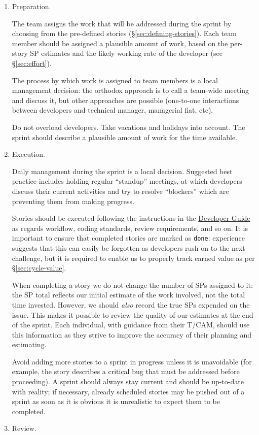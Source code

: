 \begin{enumerate}
\item
  Preparation.

  The team assigns the work that will be addressed during the sprint by choosing from the pre-defined stories (\S\ref{sec:defining-stories}).
  Each team member should be assigned a plausible amount of work, based on the per-\gls{story} \gls{SP} estimates and the likely working rate of the developer (see \S\ref{sec:effort}).

  The process by which work is assigned to team members is a local
  management decision: the orthodox approach is to call a team-wide
  meeting and discuss it, but other approaches are possible (one-to-one
  interactions between developers and technical manager, managerial
  fiat, etc).

  Do not overload developers. Take vacations and holidays into account.
  The sprint should describe a plausible amount of work for the time
  available.
\item
  Execution.

  Daily management during the sprint is a local decision. Suggested best
  practice includes holding regular ``standup'' meetings, at which
  developers discuss their current activities and try to resolve
  ``blockers'' which are preventing them from making progress.

  Stories should be executed following the instructions in the
  \href{http://developer.lsst.io/}{Developer Guide} as regards workflow,
  coding standards, review requirements, and so on. It is important to
  ensure that completed stories are marked as \texttt{done}:
  experience suggests that this can easily be forgotten as developers
  rush on to the next challenge, but it is required to enable us to
  properly track earned value as per \S\ref{sec:cycle-value}.

  When completing a \gls{story} we do not change the number of \glspl{SP} assigned to
  it: the \gls{SP} total reflects our initial estimate of the work involved,
  not the total time invested.
  However, we should \textit{also} record the true \glspl{SP} expended on the issue.
  This makes it possible to review the quality of our estimates at the end of the sprint.
  Each individual, with guidance from their \gls{T/CAM}, should use this information as they strive to improve the accuracy of their planning and estimating.

  Avoid adding more stories to a sprint in progress unless it is
  unavoidable (for example, the \gls{story} describes a critical bug that must
  be addressed before proceeding). A sprint should always stay current
  and should be up-to-date with reality; if necessary, already scheduled
  stories may be pushed out of a sprint as soon as it is obvious it is
  unrealistic to expect them to be completed.
\item
  \gls{Review}.


\end{enumerate}
